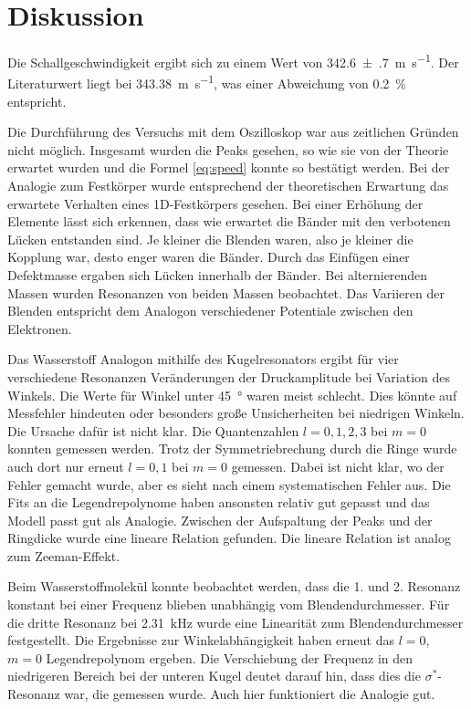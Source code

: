 \section{Diskussion}
\label{sec:Diskussion}

Die Schallgeschwindigkeit ergibt sich zu einem Wert von \SI{342.6(7)}{\meter\per\second}. Der Literaturwert liegt bei \SI{343.38}{\meter\per\second}, was einer Abweichung von \SI{0.2}{\percent} entspricht. 

Die Durchführung des Versuchs mit dem Oszilloskop war aus zeitlichen Gründen nicht möglich. 
Insgesamt wurden die Peaks gesehen, so wie sie von der Theorie erwartet wurden und die Formel \eqref{eq:speed} konnte so bestätigt werden. 
Bei der Analogie zum Festkörper wurde entsprechend der theoretischen Erwartung das erwartete Verhalten eines 1D-Festkörpers gesehen. Bei einer Erhöhung der Elemente lässt sich erkennen, dass wie erwartet die Bänder mit den verbotenen Lücken entstanden sind. Je kleiner die Blenden waren, also je kleiner die Kopplung war, desto enger waren die Bänder. 
Durch das Einfügen einer Defektmasse ergaben sich Lücken innerhalb der Bänder. 
Bei alternierenden Massen wurden Resonanzen von beiden Massen beobachtet.
Das Variieren der Blenden entspricht dem Analogon verschiedener Potentiale zwischen den Elektronen. 

Das Wasserstoff Analogon mithilfe des Kugelresonators ergibt für vier verschiedene Resonanzen Veränderungen der Druckamplitude bei Variation des Winkels. Die Werte für Winkel unter \SI{45}{\degree} waren meist schlecht. Dies könnte auf Messfehler hindeuten oder besonders große Unsicherheiten bei niedrigen Winkeln. Die Ursache dafür ist nicht klar. 
Die Quantenzahlen $l=0,1,2,3$ bei $m=0$ konnten gemessen werden. Trotz der Symmetriebrechung durch die Ringe wurde auch dort nur erneut $l=0, 1$ bei $m=0$ gemessen. Dabei ist nicht klar, wo der Fehler gemacht wurde, aber es sieht nach einem systematischen Fehler aus.  
Die Fits an die Legendrepolynome haben ansonsten relativ gut gepasst und das Modell passt gut als Analogie. 
Zwischen der Aufspaltung der Peaks und der Ringdicke wurde eine lineare Relation gefunden. Die lineare Relation ist analog zum Zeeman-Effekt.

Beim Wasserstoffmolekül konnte beobachtet werden, dass die 1. und 2. Resonanz konstant bei einer Frequenz blieben unabhängig vom Blendendurchmesser. 
Für die dritte Resonanz bei \SI{2.31}{\kilo\hertz} wurde eine Linearität zum Blendendurchmesser festgestellt.
Die Ergebnisse zur Winkelabhängigkeit haben erneut das $l=0$, $m=0$ Legendrepolynom ergeben. 
Die Verschiebung der Frequenz in den niedrigeren Bereich bei der unteren Kugel deutet darauf hin, dass dies die $\sigma^*$-Resonanz war, die gemessen wurde.
Auch hier funktioniert die Analogie gut. 

